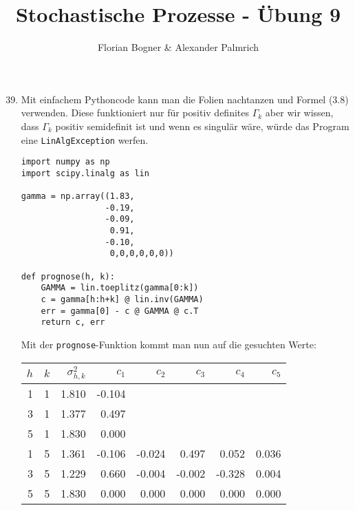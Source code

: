 \documentclass[a4paper,11pt,notitlepage,fullpage]{article}
\begin{document}
\author{Florian Bogner \& Alexander Palmrich}
\title{Stochastische Prozesse - Übung 9}
\maketitle

\begin{enumerate}
\setcounter{enumi}{38}


\item Mit einfachem Pythoncode kann man die Folien nachtanzen und Formel (3.8) verwenden. Diese funktioniert nur für positiv definites $\Gamma_k$ aber wir wissen, dass $\Gamma_k$ positiv semidefinit ist und wenn es singulär wäre, würde das Program eine \verb|LinAlgException| werfen.
\begin{verbatim}
import numpy as np
import scipy.linalg as lin

gamma = np.array((1.83,
                 -0.19,
                 -0.09,
                  0.91,
                 -0.10,
                  0,0,0,0,0,0))

def prognose(h, k):
    GAMMA = lin.toeplitz(gamma[0:k])
    c = gamma[h:h+k] @ lin.inv(GAMMA)
    err = gamma[0] - c @ GAMMA @ c.T
    return c, err
\end{verbatim}

Mit der \verb|prognose|-Funktion kommt man nun auf die gesuchten Werte:
\begin{table}[h]
\centering
\begin{tabular}{|r|r|r|rrrrr|}
\hline
$h$ & $k$ & $\sigma_{h,k}^2$ & $c_1$ & $c_2$ & $c_3$ & $c_4$ & $c_5$ \\ \hline
1 & 1 & 1.810 & -0.104 &&&&\\
3 & 1 & 1.377 & 0.497 &&&&\\
5 & 1 & 1.830 & 0.000 &&&&\\
1 & 5 & 1.361 & -0.106 & -0.024 & 0.497 & 0.052 & 0.036 \\
3 & 5 & 1.229 & 0.660 & -0.004 & -0.002 & -0.328 & 0.004 \\
5 & 5 & 1.830 & 0.000 & 0.000 & 0.000 & 0.000 & 0.000 \\
\hline
\end{tabular}
\end{table}


\end{enumerate}
\end{document}
